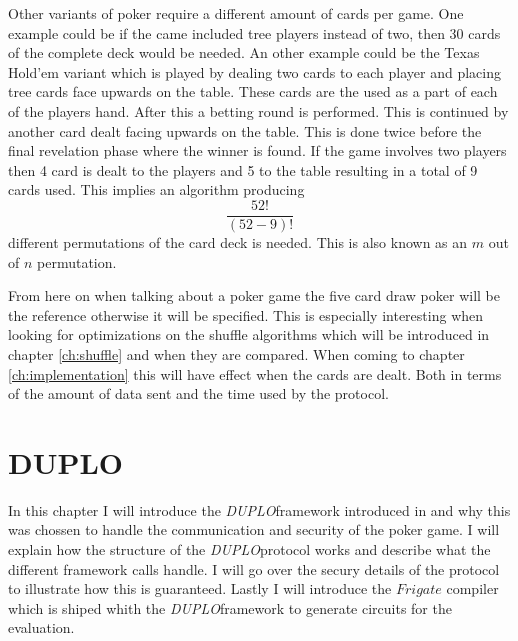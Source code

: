 \documentclass[twoside,11pt,openright]{report}
\newcommand{\DUPLO}{\textit{DUPLO}}
\begin{document}
Other variants of poker require a different amount of cards per game. One example could be if the came included tree players instead of two, then 30 cards of the complete deck would be needed. An other example could be the Texas Hold'em variant which is played by dealing two cards to each player and placing tree cards face upwards on the table. These cards are the used as a part of each of the players hand. After this a betting round is performed. This is continued by another card dealt facing upwards on the table. This is done twice before the final revelation phase where the winner is found. If the game involves two players then 4 card is dealt to the players and 5 to the table resulting in a total of 9 cards used. This implies an algorithm producing $$\frac{52!}{(52-9)!}$$ different permutations of the card deck is needed. This is also known as an $m$ out of $n$ permutation.

From here on when talking about a poker game the five card draw poker will be the reference otherwise it will be specified. This is especially interesting when looking for optimizations on the shuffle algorithms which will be introduced in chapter \ref{ch:shuffle} and when they are compared. When coming to chapter \ref{ch:implementation} this will have effect when the cards are dealt. Both in terms of the amount of data sent and the time used by the protocol.


\chapter{DUPLO}
\label{ch:duplo}

In this chapter I will introduce the \DUPLO framework introduced in  and why this was chossen to handle the communication and security of the poker game. I will explain how the structure of the \DUPLO protocol works and describe what the different framework calls handle. I will go over the secury details of the protocol to illustrate how this is guaranteed. Lastly I will introduce the $Frigate$ compiler which is shiped whith the \DUPLO framework to generate circuits for the evaluation.

\bigskip
\end{document}
